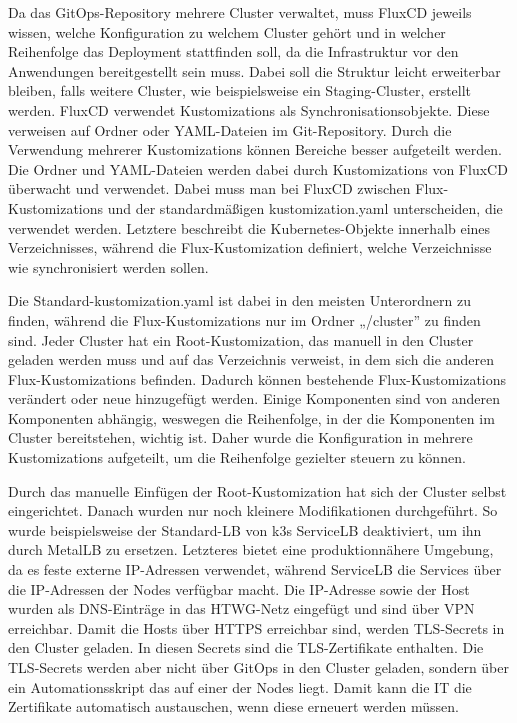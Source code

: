 Da das GitOps-Repository mehrere Cluster verwaltet, muss FluxCD jeweils wissen, welche Konfiguration zu welchem Cluster gehört und in welcher Reihenfolge das Deployment stattfinden soll, da die Infrastruktur vor den Anwendungen bereitgestellt sein muss. Dabei soll die Struktur leicht erweiterbar bleiben, falls weitere Cluster, wie beispielsweise ein Staging-Cluster, erstellt werden.
FluxCD verwendet Kustomizations als Synchronisationsobjekte. Diese verweisen auf Ordner oder YAML-Dateien im Git-Repository.
Durch die Verwendung mehrerer Kustomizations können Bereiche besser aufgeteilt werden. 
Die Ordner und YAML-Dateien werden dabei durch Kustomizations von FluxCD überwacht und verwendet.
Dabei muss man bei FluxCD zwischen Flux-Kustomizations und der standardmäßigen kustomization.yaml unterscheiden, die verwendet werden.
Letztere beschreibt die Kubernetes-Objekte innerhalb eines Verzeichnisses, während die Flux-Kustomization definiert, welche Verzeichnisse wie synchronisiert werden sollen.

Die Standard-kustomization.yaml ist dabei in den meisten Unterordnern zu finden, während die Flux-Kustomizations nur im Ordner „/cluster” zu finden sind.
Jeder Cluster hat ein Root-Kustomization, das manuell in den Cluster geladen werden muss und auf das Verzeichnis verweist, in dem sich die anderen Flux-Kustomizations befinden.
Dadurch können bestehende Flux-Kustomizations verändert oder neue hinzugefügt werden. 
Einige Komponenten sind von anderen Komponenten abhängig, weswegen die Reihenfolge, in der die Komponenten im Cluster bereitstehen, wichtig ist.
Daher wurde die Konfiguration in mehrere Kustomizations aufgeteilt, um die Reihenfolge gezielter steuern zu können.

Durch das manuelle Einfügen der Root-Kustomization hat sich der Cluster selbst eingerichtet.
Danach wurden nur noch kleinere Modifikationen durchgeführt. 
So wurde beispielsweise der Standard-LB von k3s ServiceLB deaktiviert, um ihn durch MetalLB zu ersetzen. Letzteres bietet eine produktionnähere Umgebung, da es feste externe IP-Adressen verwendet, während ServiceLB die Services über die IP-Adressen der Nodes verfügbar macht.
Die IP-Adresse sowie der Host wurden als DNS-Einträge in das HTWG-Netz eingefügt und sind über VPN erreichbar.
Damit die Hosts über HTTPS erreichbar sind, werden TLS-Secrets in den Cluster geladen. In diesen Secrets sind die TLS-Zertifikate enthalten.
Die TLS-Secrets werden aber nicht über GitOps in den Cluster geladen, sondern über ein Automationsskript das auf einer der Nodes liegt.
Damit kann die IT die Zertifikate automatisch austauschen, wenn diese erneuert werden müssen.

